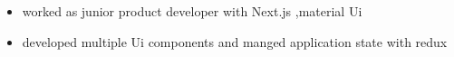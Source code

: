 \documentclass[]{junaid}
\begin{document}
\begin{minipage}[t]{0.66\textwidth}
\begin{minipage}{0.85\textwidth\vspace{2pt}}
\begin{itemize}
 \end{itemize}
\end{minipage}
\sectionsep

 
\noindent
\begin{minipage}{0.85\textwidth\vspace{2pt}}
\begin{itemize}
 \item {worked as junior product developer with Next.js ,material Ui}
 \item {developed multiple Ui components and manged application state with redux} 
\end{itemize}
\end{minipage}

\sectionsep


\end{minipage}
\end{document}
